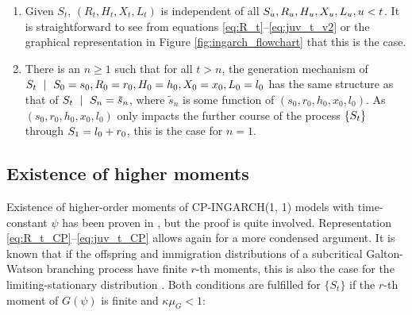 \documentclass{article}
\begin{document}
\begin{enumerate}
\item Given $S_t$, $(R_t, H_t, X_t, L_t)$ is independent of all $S_u, R_u, H_u, X_u, L_u, u < t$. It is straightforward to see from equations \eqref{eq:R_t}--\eqref{eq:juv_t_v2} or the graphical representation in Figure \ref{fig:ingarch_flowchart} that this is the case.
\item There is an $n \geq 1$ such that for all $t > n$, the generation mechanism of $\juv_t \ \mid \ \juv_0 = s_0, R_0 = r_0, H_0 = h_0, X_0 = x_0, L_0 = l_0$ has the same structure as that of $\juv_t \ \mid \ \juv_n = \tilde{s}_n$, where $\tilde{s}_n$ is some function of $(s_0, r_0, h_0, x_0, l_0)$. As $(s_0, r_0, h_0, x_0, l_0)$ only impacts the further course of the process $\{S_t\}$ through $S_1 = l_0 + r_0$, this is the case for $n = 1$. %
\end{enumerate}

\subsection{Existence of higher moments}

Existence of higher-order moments of CP-INGARCH(1, 1) models with time-constant $\psi$ has been proven in \cite{Silva2016}, but the proof is quite involved. Representation \eqref{eq:R_t_CP}--\eqref{eq:juv_t_CP} allows again for a more condensed argument. It is known that if the offspring and immigration distributions of a subcritical Galton-Watson branching process have finite $r$-th moments, this is also the case for the limiting-stationary distribution \cite[Sec. 4]{Lange1981}. Both conditions are fulfilled for $\{S_t\}$ if the $r$-th moment of $G(\psi)$ is finite and $\kappa\mu_G < 1$:
\end{document}
